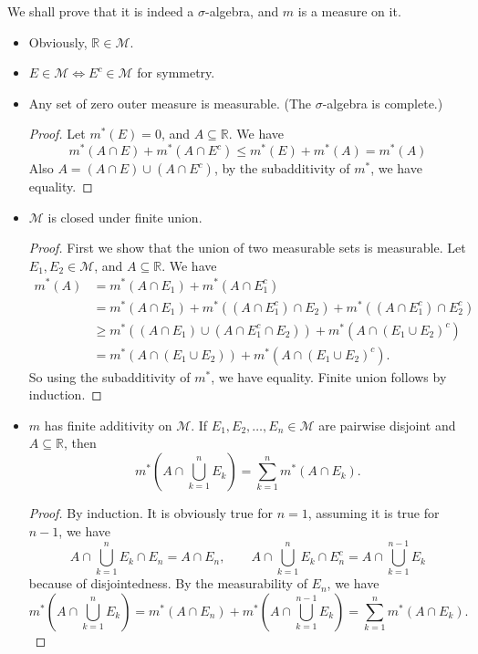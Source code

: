 \documentclass[../main.tex]{subfiles}
\begin{document}
We shall prove that it is indeed a $\sigma$-algebra, and $m$ is a measure on it.
\begin{itemize}
\item Obviously, $\mathbb{R}\in \mathcal{M}$.
\item $E\in \mathcal{M} \Leftrightarrow E^c\in \mathcal{M}$ for symmetry.
\item Any set of zero outer measure is measurable. (The $\sigma$-algebra is complete.)
	\begin{proof}
	Let $m^*(E) = 0$, and $A  \subseteq \mathbb{R}$. We have
	\begin{equation*}
	m^*(A\cap E) + m^*(A\cap E^c) \leq m^*(E) + m^*(A) = m^*(A)
	\end{equation*}
	Also $A = (A\cap E) \cup (A\cap E^c)$, by the subadditivity of $m^*$, we have equality.
	\end{proof}
\item $\mathcal{M}$ is closed under finite union.
	\begin{proof}
		First we show that the union of two measurable sets is measurable. Let $E_1,E_2 \in \mathcal{M}$, and $A \subseteq \mathbb{R}$. We have
		\begin{equation*}
			\begin{aligned}
			m^*(A) &= m^*(A \cap E_1) + m^*(A \cap E_1^c) \\
			       &= m^*(A \cap E_1) + m^*((A \cap E_1^c) \cap E_2) + m^*((A \cap E_1^c) \cap E_2^c) \\
			       &\geq  m^*((A \cap E_1) \cup (A \cap E_1^c\cap E_2)) + m^*(A \cap (E_1\cup E_2)^c) \\
			       &= m^*(A \cap (E_1\cup E_2)) + m^*(A \cap (E_1\cup E_2)^c).
			\end{aligned}
		\end{equation*}
		So using the subadditivity of $m^*$, we have equality. Finite union follows by induction.
	\end{proof}
\item $m$ has finite additivity on $\mathcal{M}$. If $E_1,E_2, \ldots ,E_n \in \mathcal{M}$ are pairwise disjoint and $A \subseteq \mathbb{R}$, then
	\begin{equation*}
		m^*\left( A\cap \bigcup_{k=1}^{n} E_k \right) = \sum_{k=1}^{n} m^*(A \cap E_k).
	\end{equation*}
	\begin{proof}
		By induction. It is obviously true for $n=1$, assuming it is true for $n-1$, we have
		\begin{equation*}
			A \cap \bigcup_{k=1}^{n} E_k \cap E_n = A \cap E_n, \qquad A \cap \bigcup_{k=1}^{n} E_k \cap E_n^c = A \cap \bigcup_{k=1}^{n-1} E_k
		\end{equation*}
		because of disjointedness. By the measurability of $E_n$, we have
		\begin{equation*}
			m^*(A \cap \bigcup_{k=1}^{n} E_k) = m^*(A \cap E_n) + m^*(A \cap \bigcup_{k=1}^{n-1} E_k) = \sum_{k=1}^{n} m^*(A \cap E_k).
		\end{equation*}
	\end{proof}


\end{itemize}
\end{document}
